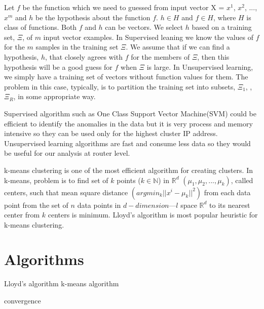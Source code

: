 \documentclass[10pt,oneside,a4paper]{report}
\begin{document}
Let $f$ be the function which we need to guessed from input vector X = $x^{1}$, $x^{2}$, ..., $x^{m}$ and $h$ be the hypothesis about the function $f$. $h \in H$ and $f \in H$, where $H$ is class of functions. Both $f$ and $h$ can be vectors. We select $h$ based on a
training set, $\Xi$, of $m$ input vector examples. In Supervised leaning we know the values of $f$ for the $m$ samples in the training set $\Xi$. We assume that if we can find a hypothesis, $h$, that closely agrees with $f$ for the members of $\Xi$, then this hypothesis will be a good guess for $f$ when $\Xi$ is large. In Unsupervised learning, we simply have a training set of vectors without function values for them. The problem in this case, typically, is to partition the training set into subsets, $\Xi_1$,  ,$\Xi_R$, in some appropriate way.\cite{clusterning}

Supervised algorithm such as One Class Support Vector Machine(SVM) could be efficient to identify the anomalies in the data but it is very process and memory intensive so they can be used only for the highest cluster IP address. Unsupervised learning algorithms are fast and consume less data so they would be useful for our analysis at router level.

k-means clustering is one of the most efficient algorithm for creating clusters. In k-means, problem is to find set of $k$ points ($k \in \mathbb{N}$) in $\mathbb{R}^d$ $(\mu_{1}, \mu_{2}, ..., \mu_{k})$, called centers, such that mean square distance $(argmin_{k} || x^{i} {-} \mu_{k} ||^{2})$ from each data point from the set of $n$ data points in $d-dimensionl$ space $\mathbb{R}^d$ to its nearest center from $k$ centers is minimum. Lloyd's algorithm is most popular heuristic for k-means clustering.

\chapter{Algorithms}

\begin{algorithm}
\caption{Lloyd's algorithm k-means algorithm}\label{kmeans}
\begin{algorithmic}
\Repeat
  \EndFor
  \EndFor
\Until convergence
\end{algorithmic}
\end{algorithm}
\end{document}
